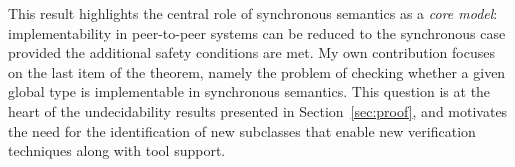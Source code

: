 This result highlights the central role of synchronous semantics as a 
\emph{core model}: implementability in peer-to-peer systems 
can be reduced to the synchronous case provided the additional safety 
conditions are met. My own contribution focuses on the last item of the 
theorem, namely the problem of checking whether a given global type is 
implementable in synchronous semantics. This question is at the heart 
of the undecidability results presented in Section~\ref{sec:proof}, 
and motivates the need for the identification of new subclasses that 
enable new verification techniques along with tool support.